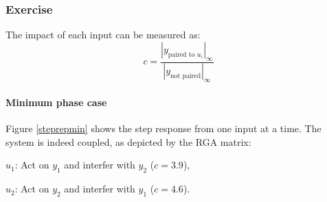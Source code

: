 \subsubsection{Exercise} 

The impact of each input can be measured as:
$$
c = \frac{|y_{\text{paired to } u_i}|_{\infty}}{|y_{\text{not paired}}|_{\infty}}
$$

\paragraph{Minimum phase case}

Figure \ref{steprepmin} shows the step response from one input at a time.
The system is indeed coupled, as depicted by the RGA matrix:
\begin{shortitemize}
    \item $u_1$: Act on $y_1$ and interfer with $y_2$ ($c = 3.9$), 
    \item $u_2$: Act on $y_2$ and interfer with $y_1$ ($c = 4.6$).
\end{shortitemize}

